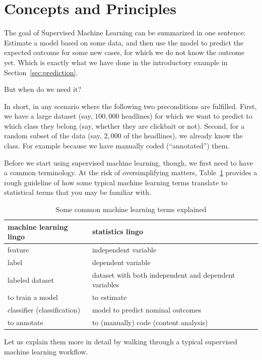 \section{Concepts and Principles}

The goal of Supervised Machine Learning can be summarized in one sentence:
Estimate a model based on some data, and then use the model to predict the
expected outcome for some new cases, for which we do not know the outcome yet.
Which is exactly what we have done in the introductory example in Section~\ref{sec:prediction}.

But when do we need it?

In short, in any scenario where the following two preconditions are fulfilled.
First, we have a large dataset (say, $100,000$
headlines) for which we want to predict to which class they belong (say, whether
they are clickbait or not).
Second, for a random subset of the data (say, $2,000$ of the headlines), we already
know the class.
For example because we have manually coded (``annotated'') them.

Before we start using supervised machine learning, though, we first need to have
a common terminology.
At the risk of oversimplifying matters, Table~\ref{tab:mllingo} provides a rough
guideline of how some typical machine learning terms translate to statistical
terms that you may be familiar with.

\begin{table}
  \centering
\begin{tabularx}{\textwidth}{XX}
\toprule
machine learning lingo  & statistics lingo\\ \midrule
feature                 & independent variable  \\
label                   & dependent variable  \\
labeled dataset         & dataset with both independent and dependent variables\\
to train a model        & to estimate \\
classifier (classification)  & model to predict nominal outcomes \\
to annotate             & to (manually) code (content analysis) \\
\bottomrule
\end{tabularx}
\caption{Some common machine learning terms explained\label{tab:mllingo}}
\end{table}

Let us explain them more in detail by walking through a typical supervised
machine learning workflow.

